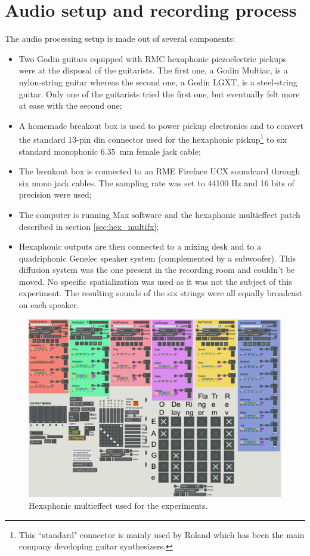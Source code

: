 \documentclass{article}
\begin{document}
\section{Audio setup and recording process}\label{sec:setup}
The audio processing setup is made out of several components: 
\begin{itemize}
    \item Two Godin guitars equipped with RMC hexaphonic piezoelectric pickups were at the disposal of the guitarists. 
    The first one, a Godin Multiac, is a nylon-string guitar whereas the second one, a Godin LGXT, is a steel-string 
    guitar. Only one of the guitarists tried the first one, but eventually felt more at ease with the second one;
    \item A homemade breakout box is used to power pickup electronics and to convert the standard 13-pin din connector 
    used for the hexaphonic pickup\footnote{This ``standard" connector is mainly used by Roland which has been the main company developing guitar synthesizers.} to six standard monophonic 6.35~mm female jack cable;
    \item The breakout box is connected to an RME Fireface UCX soundcard through six mono jack cables. The sampling rate was 
    set to 44100 Hz and 16 bits of precision were used;
	\item The computer is running Max software and the hexaphonic multieffect patch described in section \ref{sec:hex_multifx};
    \item Hexaphonic outputs are then connected to a mixing desk and to a quadriphonic Genelec speaker system (complemented by a
    subwoofer). This diffusion system was the one present in the recording room and couldn't be moved. No specific
    spatialization was used as it was not the subject of this experiment. The resulting sounds of the six strings were all equally broadcast on each speaker.
    
\end{itemize}

\begin{figure}
    \centering
    \includegraphics[width=\columnwidth]{figures/191025-Patch-experience.png}
    \caption{Hexaphonic multieffect used for the experiments.}
    \label{fig:hex-multieffect}
\end{figure}
\end{document}
